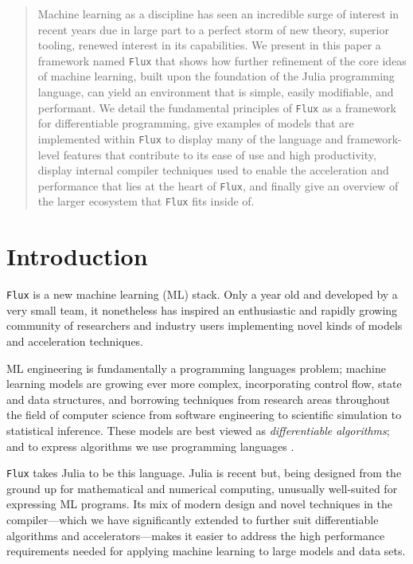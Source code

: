 \documentclass{juliacon}
\begin{document}


\maketitle

\begin{abstract}

Machine learning as a discipline has seen an incredible surge of interest in recent years due in large part to a perfect storm of new theory, superior tooling, renewed interest in its capabilities.  We present in this paper a framework named \texttt{Flux} that shows how further refinement of the core ideas of machine learning, built upon the foundation of the Julia programming language, can yield an environment that is simple, easily modifiable, and performant.  We detail the fundamental principles of \texttt{Flux} as a framework for differentiable programming, give examples of models that are implemented within \texttt{Flux} to display many of the language and framework-level features that contribute to its ease of use and high productivity, display internal compiler techniques used to enable the acceleration and performance that lies at the heart of \texttt{Flux}, and finally give an overview of the larger ecosystem that \texttt{Flux} fits inside of.

\headingtable
\end{abstract}

\section{Introduction}

\texttt{Flux} is a new machine learning (ML) stack. Only a year old and developed by a very small team, it nonetheless has inspired an enthusiastic and rapidly growing community of researchers and industry users implementing novel kinds of models and acceleration techniques.

ML engineering is fundamentally a programming languages problem; machine learning models are growing ever more complex, incorporating control flow, state and data structures, and borrowing techniques from research areas throughout the field of computer science from software engineering to scientific simulation to statistical inference.  These models are best viewed as \textit{differentiable algorithms}; and to express algorithms we use programming languages \cite{innes2018machine}.

\texttt{Flux} takes Julia \cite{bezanson2017julia} to be this language. Julia is recent but, being designed from the ground up for mathematical and numerical computing, unusually well-suited for expressing ML programs.  Its mix of modern design and novel techniques in the compiler---which we have significantly extended to further suit differentiable algorithms and accelerators---makes it easier to address the high performance requirements needed for applying machine learning to large models and data sets.
\end{document}
